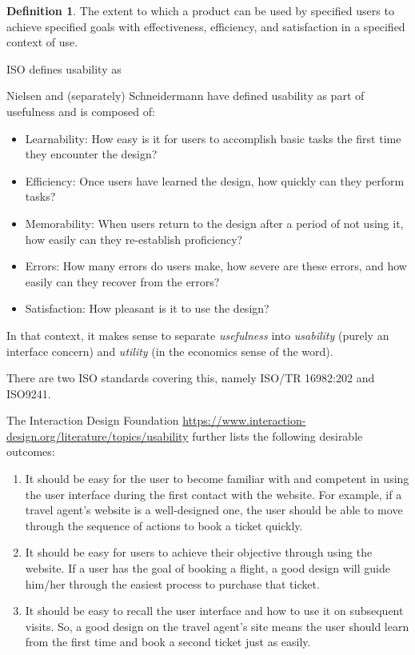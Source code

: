 \documentclass[letterpaper,cleveref]{lipics-v2019}
\theoremstyle{definition}
\newtheorem{defn}{Definition}
\begin{document}
\begin{defn}
  The extent to which a product can be used by specified users to achieve
  specified goals with effectiveness, efficiency, and satisfaction in a
  specified context of use.
\end{defn}
ISO defines usability as

Nielsen and (separately) Schneidermann have defined usability as part of
usefulness and
is composed of:
\begin{itemize}
\item Learnability: How easy is it for users to accomplish basic tasks the first
  time they encounter the design?
\item Efficiency: Once users have learned the design, how quickly can they
  perform tasks?
\item Memorability: When users return to the design after a period of not using
  it, how easily can they re-establish proficiency?
\item Errors: How many errors do users make, how severe are these errors, and
  how easily can they recover from the errors?
\item Satisfaction: How pleasant is it to use the design?
\end{itemize}
In that context, it makes sense to separate \emph{usefulness} into
\emph{usability} (purely an interface concern) and \emph{utility} (in the
economics sense of the word).

There are two ISO standards covering this, namely ISO/TR 16982:202 and ISO9241.

The Interaction Design Foundation
\url{https://www.interaction-design.org/literature/topics/usability} further
lists the following desirable outcomes:

\begin{enumerate}
\item It should be easy for the user to become familiar with and competent in
  using the user interface during the first contact with the website. For
  example, if a travel agent’s website is a well-designed one, the user should
  be able to move through the sequence of actions to book a ticket quickly.
\item It should be easy for users to achieve their objective through using the
  website. If a user has the goal of booking a flight, a good design will guide
  him/her through the easiest process to purchase that ticket.
\item It should be easy to recall the user interface and how to use it on
  subsequent visits. So, a good design on the travel agent’s site means the user
  should learn from the first time and book a second ticket just as easily.
\end{enumerate}
\end{document}
